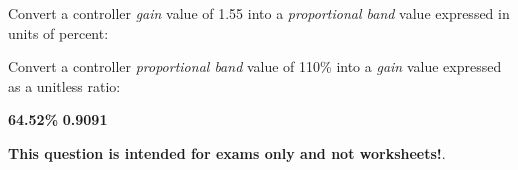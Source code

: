 

Convert a controller {\it gain} value of 1.55 into a {\it proportional band} value expressed in units of percent:

\vskip 20pt

Convert a controller {\it proportional band} value of 110\% into a {\it gain} value expressed as a unitless ratio:







{\bf 64.52\%} \hskip 30pt {\bf 0.9091}







{\bf This question is intended for exams only and not worksheets!}.


